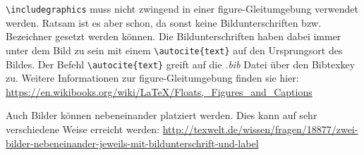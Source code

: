 \verb|\includegraphics| muss nicht zwingend in einer figure-Gleitumgebung verwendet werden. Ratsam ist es aber schon, da sonst keine Bildunterschriften bzw. Bezeichner gesetzt werden können. Die Bildunterschriften haben dabei immer unter dem Bild zu sein mit einem \verb|\autocite{text}| auf den Ursprungsort des Bildes. Der Befehl \verb|\autocite{text}| greift auf die \emph{.bib} Datei über den Bibtexkey zu. Weitere Informationen zur figure-Gleitumgebung finden sie hier: \url{https://en.wikibooks.org/wiki/LaTeX/Floats,_Figures_and_Captions}\newline

Auch Bilder können nebeneinander platziert werden. Dies kann auf sehr verschiedene Weise erreicht werden: \url{http://texwelt.de/wissen/fragen/18877/zwei-bilder-nebeneinander-jeweils-mit-bildunterschrift-und-label} 

